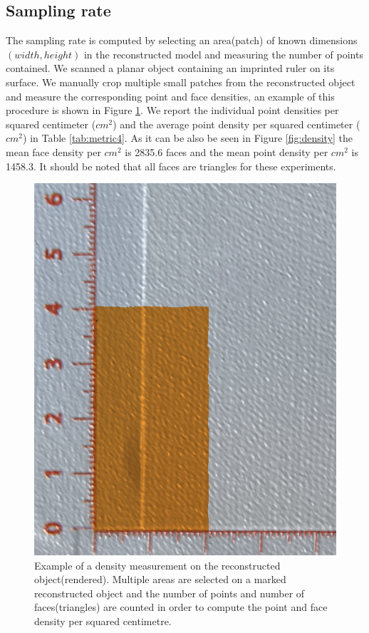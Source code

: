 \documentclass[final,12pt,3p]{elsarticle}
\begin{document}
\subsection{Sampling rate}
The sampling rate is computed by selecting an area(patch) of known dimensions $(width, height)$ in the reconstructed model and measuring the number of points contained. We scanned a planar object containing an imprinted ruler on its surface. We manually crop multiple small patches from the reconstructed object and measure the corresponding point and face densities, an example of this procedure is shown in Figure \ref{fig:area_selection}. We report the individual point densities per squared centimeter ($cm^2$) and the average point density per squared centimeter ($cm^2$) in Table \ref{tab:metric4}. As it can be also be seen in Figure \ref{fig:density} the mean face density per $cm^2$ is 2835.6 faces and the mean point density per $cm^2$ is 1458.3. It should be noted that all faces are triangles for these experiments.

\begin{figure}[!ht]
	\centering	
	\includegraphics[scale=0.35]{./images/area_selection.png}
	\caption{\label{fig:area_selection} Example of a density measurement on the reconstructed object(rendered). Multiple areas are selected on a marked reconstructed object and the number of points and number of faces(triangles) are counted in order to compute the point and face density per squared centimetre. }
\end{figure}
\end{document}
